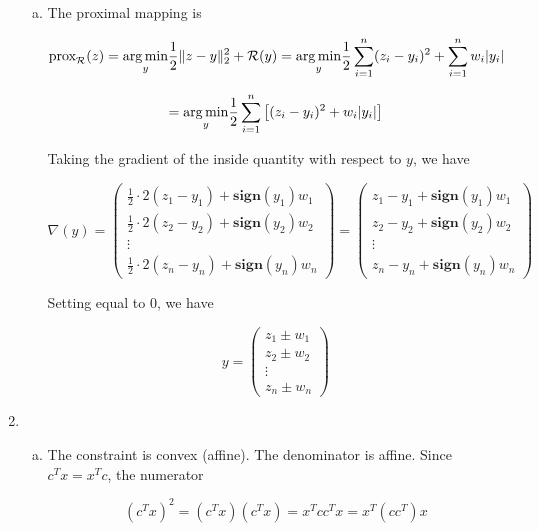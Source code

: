 \begin{enumerate}[(1)]
\begin{enumerate}[(a)]
\item The proximal mapping is

\[
\text{prox}_\mathcal{R}(z) = \underset{y}{\operatorname*{arg\,min}} \frac{1}{2} \Vert z - y\rVert_2^2 + \mathcal{R}(y) = \underset{y}{\operatorname*{arg\,min}} \frac{1}{2}  \sum_{i=1}^n (z_i - y_i)^2  + \sum_{i=1}^n w_i |y_i|
\]

\[
= \underset{y}{\operatorname*{arg\,min}} \frac{1}{2}  \sum_{i=1}^n \big[ (z_i - y_i)^2  + w_i |y_i| \big]
\]

Taking the gradient of the inside quantity with respect to \(y\), we have

\[
\nabla(y) =  \begin{pmatrix} \frac{1}{2}  \cdot 2 (z_1 - y_1)   + \textbf{sign}(y_1) w_1 \\ 
 \frac{1}{2}  \cdot 2 (z_2 - y_2)  + \textbf{sign}(y_2) w_2 \\ 
 \vdots \\
  \frac{1}{2}  \cdot 2 (z_n - y_n)  + \textbf{sign}(y_n) w_n 
  \end{pmatrix} = \begin{pmatrix} z_1 - y_1  + \textbf{sign}(y_1) w_1 \\ 
 z_2 - y_2  + \textbf{sign}(y_2)w_2 \\ 
 \vdots \\
  z_n - y_n + \textbf{sign}(y_n) w_n 
  \end{pmatrix} 
\]

Setting equal to 0, we have

\[
y = \begin{pmatrix} z_1 \pm w_1 \\ 
 z_2   \pm w_2 \\ 
 \vdots \\
  z_n  \pm w_n 
  \end{pmatrix} 
\]

\end{enumerate}


\item



\begin{enumerate}[(a)]

\item The constraint is convex (affine). The denominator is affine. Since \(c^Tx = x^Tc\), the numerator 

\[
(c^Tx)^2 = (c^T x)( c^T x) = x^T c c^T x = x^T (c c^T) x 
\]


\end{enumerate}
\end{enumerate}
